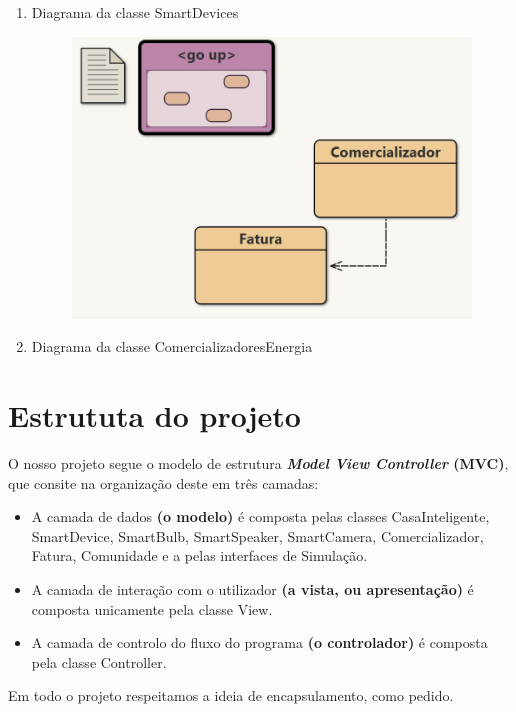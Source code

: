 \documentclass[11pt,a4paper]{report}
\begin{document}
\begin{enumerate}
\item Diagrama da classe SmartDevices 
\vspace{15mm} %

    \begin{figure}[H]
    		\includegraphics[scale=0.8]{diagrama4.jpg}
	\end{figure}
	
\item Diagrama da classe ComercializadoresEnergia

\end{enumerate}
    \pagebreak

\chapter{Estrututa do projeto}

O nosso projeto segue o modelo de estrutura \textbf{\textit{Model View Controller} (MVC)}, que consite na organização deste em três camadas:
	\begin{itemize}
		\item A camada de dados \textbf{(o modelo)} é composta pelas classes CasaInteligente, SmartDevice, SmartBulb, SmartSpeaker, SmartCamera, Comercializador, Fatura, Comunidade e a pelas interfaces de Simulação.
		\item A camada de interação com o utilizador \textbf{(a vista, ou apresentação)} é composta unicamente pela classe View.
		\item A camada de controlo do fluxo do programa\textbf{ (o controlador)} é composta pela classe Controller.
	\end{itemize}
        Em todo o projeto respeitamos a ideia de encapsulamento, como pedido.
\end{document}
